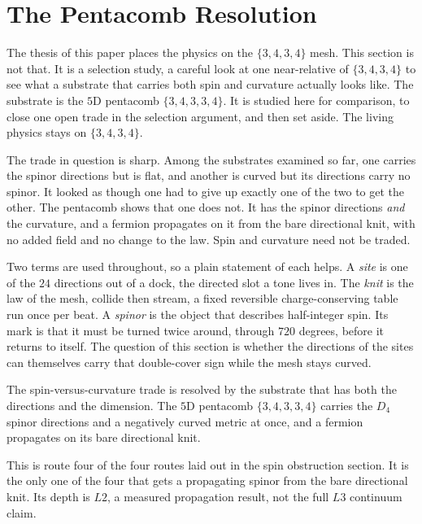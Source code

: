 \section{The Pentacomb Resolution}

The thesis of this paper places the physics on the $\{3,4,3,4\}$ mesh. This
section is not that. It is a selection study, a careful look at one near-relative
of $\{3,4,3,4\}$ to see what a substrate that carries both spin and curvature
actually looks like. The substrate is the $5$D pentacomb $\{3,4,3,3,4\}$. It is
studied here for comparison, to close one open trade in the selection argument, and
then set aside. The living physics stays on $\{3,4,3,4\}$.

The trade in question is sharp. Among the substrates examined so far, one carries
the spinor directions but is flat, and another is curved but its directions carry
no spinor. It looked as though one had to give up exactly one of the two to get the
other. The pentacomb shows that one does not. It has the spinor directions
\emph{and} the curvature, and a fermion propagates on it from the bare directional
knit, with no added field and no change to the law. Spin and curvature need not be
traded.

Two terms are used throughout, so a plain statement of each helps. A \emph{site} is
one of the $24$ directions out of a dock, the directed slot a tone lives in. The
\emph{knit} is the law of the mesh, collide then stream, a fixed reversible
charge-conserving table run once per beat. A \emph{spinor} is the object that
describes half-integer spin. Its mark is that it must be turned twice around, through
$720$ degrees, before it returns to itself. The question of this section is whether
the directions of the sites can themselves carry that double-cover sign while the
mesh stays curved.

\begin{result}
The spin-versus-curvature trade is resolved by the substrate that has both the
directions and the dimension. The $5$D pentacomb $\{3,4,3,3,4\}$ carries the $D_4$
spinor directions and a negatively curved metric at once, and a fermion propagates
on its bare directional knit.
\end{result}

This is route four of the four routes laid out in the spin obstruction section. It
is the only one of the four that gets a propagating spinor from the bare directional
knit. Its depth is $L2$, a measured propagation result, not the full $L3$ continuum
claim.

